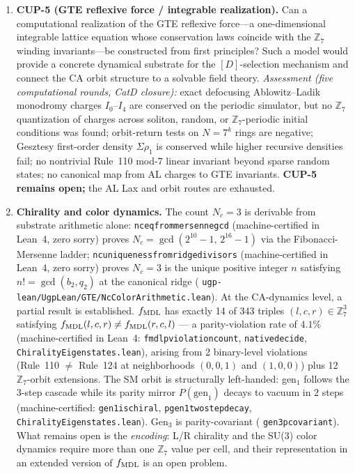 \documentclass[11pt]{article}
\theoremstyle{remark}
\newcommand{\Nc}{N_c}
\newcommand{\lean}[1]{%
  \penalty-100
  \begingroup\def\_{\textunderscore\allowbreak}\texttt{#1}\endgroup}
\begin{document}
\begin{enumerate}
\item \textbf{CUP-5 (GTE reflexive force / integrable realization).}
Can a computational realization of the GTE reflexive force---a one-dimensional integrable
lattice equation whose conservation laws coincide with the $\mathbb{Z}_7$ winding
invariants---be constructed from first principles? Such a model would provide a concrete
dynamical substrate for the $[D]$-selection mechanism and connect the CA orbit structure
to a solvable field theory.
\emph{Assessment (five computational rounds, CatD closure):}
exact defocusing Ablowitz--Ladik monodromy charges $I_0$--$I_4$ are conserved on the
periodic simulator, but no $\mathbb{Z}_7$ quantization of charges across soliton,
random, or $\mathbb{Z}_7$-periodic initial conditions was found; orbit-return tests on
$N = 7^k$ rings are negative; Gesztesy first-order density $\Sigma\rho_1$ is conserved
while higher recursive densities fail; no nontrivial Rule~110 mod-$7$ linear invariant
beyond sparse random states; no canonical map from AL charges to GTE invariants.
\textbf{CUP-5 remains open;} the AL Lax and orbit routes are exhausted.

\item \textbf{Chirality and color dynamics.}
The count $\Nc = 3$ is derivable from substrate arithmetic alone:
\lean{nc\_eq\_3\_from\_mersenne\_gcd} (machine-certified in Lean~4, zero sorry) proves
$\Nc = \gcd(2^{10}-1,\,2^{16}-1)$ via the Fibonacci-Mersenne ladder;
\lean{nc\_uniqueness\_from\_ridge\_divisors} (machine-certified in Lean~4, zero sorry) proves
$\Nc = 3$ is the unique positive integer $n$ satisfying $n! = \gcd(b_2, q_2)$
at the canonical ridge
(\lean{ugp-lean/UgpLean/GTE/NcColorArithmetic.lean}).
At the CA-dynamics level, a partial result is established.
$f_{\rm MDL}$ has exactly 14 of 343 triples $(l,c,r) \in \mathbb{Z}_7^3$ satisfying
$f_{\rm MDL}(l,c,r) \neq f_{\rm MDL}(r,c,l)$ --- a parity-violation rate of $4.1\%$
(machine-certified in Lean~4: \lean{fmdl\_p\_violation\_count}, \lean{native\_decide},
\lean{Chirality\allowbreak{}Eigenstates\allowbreak.lean}), arising from 2 binary-level violations
(Rule~110 $\neq$ Rule~124 at neighborhoods $(0,0,1)$ and $(1,0,0)$) plus 12
$\mathbb{Z}_7$-orbit extensions.
The SM orbit is structurally left-handed: gen$_1$ follows the 3-step cascade while its
parity mirror $P(\text{gen}_1)$ decays to vacuum in 2 steps
(machine-certified: \lean{gen1\_is\_chiral}, \lean{p\_gen1\_two\_step\_decay}, \lean{Chirality\allowbreak{}Eigenstates\allowbreak.lean}).
Gen$_3$ is parity-covariant (\lean{gen3\_p\_covariant}).
What remains open is the \emph{encoding}: L/R chirality and the SU(3) color
dynamics require more than one $\mathbb{Z}_7$ value per cell, and their
representation in an extended version of $f_{\rm MDL}$ is an open problem.


\end{enumerate}
\end{document}
